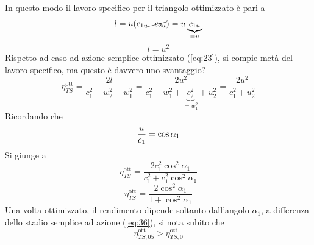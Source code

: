 \documentclass[a4paper, 15pt]{article}
\begin{document}
\begin{adjustwidth}{2in}{}
	In questo modo il lavoro specifico per il triangolo ottimizzato è pari a 
	\[l=u(c_{1u}\cancel{-c_{2u}}) = u\underbrace{c_{1u}}_{=u}\]
	\begin{equation}\label{eq:34}
		\boxed{l=u^2}
	\end{equation}
	Rispetto ad caso ad azione semplice ottimizzato (\ref{eq:23}), si compie metà del lavoro specifico, ma questo è davvero uno svantaggio? 
	\[\eta^\text{ott}_{TS}=\dfrac{2l}{c_1^2 + w_2^2-w_1^2} = \dfrac{2u^2}{c_1^2 -w_1^2 + \underbrace{c_2^2}_{=w_1^2}+u_2^2} =\dfrac{2u^2}{c_1^2+u_2^2}\]
	Ricordando che 
	\[{u\over c_1}=\cos\alpha_1\]
	Si giunge a
	\[\eta^\text{ott}_{TS} = \dfrac{2c_1^2\cos^2\alpha_1}{c_1^2+c_1^2\cos^2\alpha_1}\]
	\begin{equation}\label{eq:35}
		\boxed{\eta^\text{ott}_{TS} = \dfrac{2\cos^2\alpha_1}{1+\cos^2\alpha_1}}
	\end{equation}
	Una volta ottimizzato, il rendimento dipende soltanto dall'angolo $\alpha_1$, a differenza dello stadio semplice ad azione (\ref{eq:36}), si nota subito che 
	\[\eta^\text{ott}_{TS, 05} > \eta^\text{ott}_{TS, 0}\]
\end{adjustwidth}	
	

\newpage
\end{document}

